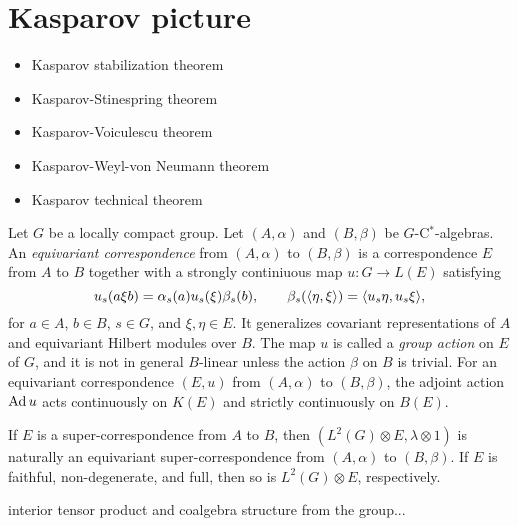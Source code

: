 \documentclass{../../large}
\begin{document}
\section{Kasparov picture}

\begin{itemize}
\item Kasparov stabilization theorem
\item Kasparov-Stinespring theorem
\item Kasparov-Voiculescu theorem
\item Kasparov-Weyl-von Neumann theorem
\item Kasparov technical theorem
\end{itemize}

\begin{prb}
Let $G$ be a locally compact group.
Let $(A,\alpha)$ and $(B,\beta)$ be $G$-C$^*$-algebras.
An \emph{equivariant correspondence} from $(A,\alpha)$ to $(B,\beta)$ is a correspondence $E$ from $A$ to $B$ together with a strongly continiuous map $u:G\to L(E)$ satisfying
\[u_s(a\xi b)=\alpha_s(a)u_s(\xi)\beta_s(b),\qquad\beta_s(\langle\eta,\xi\rangle)=\langle u_s\eta,u_s\xi\rangle,\]
for $a\in A$, $b\in B$, $s\in G$, and $\xi,\eta\in E$.
It generalizes covariant representations of $A$ and equivariant Hilbert modules over $B$.
The map $u$ is called a \emph{group action} on $E$ of $G$, and it is not in general $B$-linear unless the action $\beta$ on $B$ is trivial.
For an equivariant correspondence $(E,u)$ from $(A,\alpha)$ to $(B,\beta)$, the adjoint action $\operatorname{Ad} u$ acts continuously on $K(E)$ and strictly continuously on $B(E)$.
\begin{parts}
\item If $E$ is a super-correspondence from $A$ to $B$, then $(L^2(G)\otimes E,\lambda\otimes1)$ is naturally an equivariant super-correspondence from $(A,\alpha)$ to $(B,\beta)$.
If $E$ is faithful, non-degenerate, and full, then so is $L^2(G)\otimes E$, respectively.
\item interior tensor product and coalgebra structure from the group...
\end{parts}
\end{prb}
\end{document}
